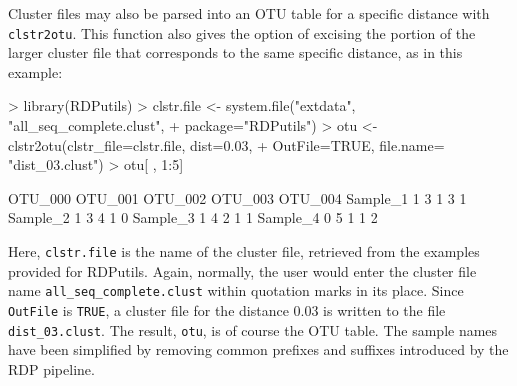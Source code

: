 \documentclass{article}
\begin{document}
Cluster files may also be parsed into an OTU table for a specific distance with \texttt{clstr2otu}.  This function also gives the option of excising the portion of the larger cluster file that corresponds to the same specific distance, as in this example: 
\begin{Schunk}
\begin{Sinput}
> library(RDPutils)
> clstr.file <- system.file("extdata", "all_seq_complete.clust", 
+                           package="RDPutils")
> otu <- clstr2otu(clstr_file=clstr.file, dist=0.03, 
+                  OutFile=TRUE, file.name= "dist_03.clust")
> otu[ , 1:5] 
\end{Sinput}
\begin{Soutput}
         OTU_000 OTU_001 OTU_002 OTU_003 OTU_004
Sample_1       1       3       1       3       1
Sample_2       1       3       4       1       0
Sample_3       1       4       2       1       1
Sample_4       0       5       1       1       2
\end{Soutput}
\end{Schunk}
Here, \texttt{clstr.file} is the name of the cluster file, retrieved from the examples provided for RDPutils.  Again, normally, the user would enter the cluster file name \texttt{all\_seq\_complete.clust} within quotation marks in its place.  Since \texttt{OutFile} is \texttt{TRUE}, a cluster file for the distance 0.03 is written to the file \texttt{dist\_03.clust}.  The result, \texttt{otu}, is of course the OTU table.  The sample names have been simplified by removing common prefixes and suffixes introduced by the RDP pipeline.
\end{document}

